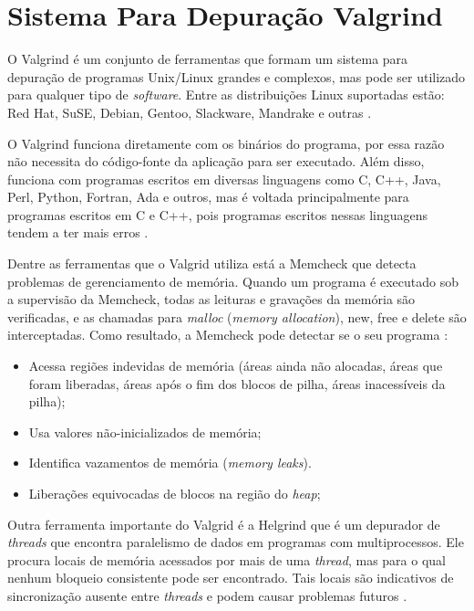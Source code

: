 \section{Sistema Para Depuração Valgrind}\label{sec:Valgrind}


O Valgrind é um conjunto de ferramentas que formam um sistema para depuração de programas Unix/Linux grandes e complexos, mas pode ser utilizado para qualquer tipo de \textit{software}. Entre as distribuições Linux suportadas estão: Red Hat, SuSE, Debian, Gentoo, Slackware, Mandrake e outras \cite{Valgrind:2017}.

O Valgrind funciona diretamente com os binários do programa, por essa razão não necessita do código-fonte da aplicação para ser executado. Além disso, funciona com programas escritos em diversas linguagens como C, C++, Java, Perl, Python, Fortran, Ada e outros, mas é voltada principalmente para programas escritos em C e C++, pois programas escritos nessas linguagens tendem a ter mais erros \cite{Valgrind:2017}.
 
Dentre as ferramentas que o Valgrid utiliza está a Memcheck que detecta problemas de gerenciamento de memória. Quando um programa é executado sob a supervisão da Memcheck, todas as leituras e gravações da memória são verificadas, e as chamadas para \textit{malloc} (\textit{memory allocation}), new, free e delete são interceptadas. Como resultado, a Memcheck pode detectar se o seu programa \cite{Valgrind:2017}:

\begin{itemize}
	\item Acessa regiões indevidas de memória (áreas ainda não alocadas, áreas que foram liberadas, áreas após o fim dos blocos de pilha, áreas inacessíveis da pilha);
	\item Usa valores não-inicializados de memória;
	\item Identifica vazamentos de memória (\textit{memory leaks}).
	\item Liberações equivocadas de blocos na região do \textit{heap};
\end{itemize}

Outra ferramenta importante do Valgrid é a Helgrind que é um depurador de \textit{threads} que encontra paralelismo de dados em programas com multiprocessos. Ele procura locais de memória acessados por mais de uma \textit{thread}, mas para o qual nenhum bloqueio consistente pode ser encontrado. Tais locais são indicativos de sincronização ausente entre \textit{threads} e podem causar problemas futuros \cite{Valgrind:2017}.




